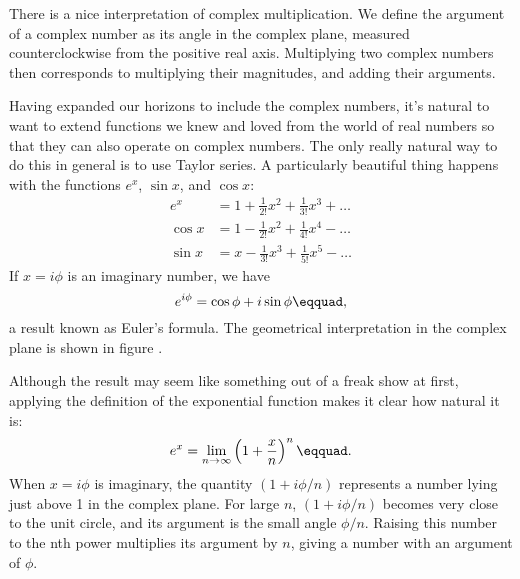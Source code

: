 
There is a nice interpretation of complex multiplication.
We define the argument of a complex number as its angle in the complex plane, measured
counterclockwise from the positive real axis.
Multiplying two complex numbers then corresponds to multiplying their magnitudes,
and adding their arguments.


Having expanded our horizons to include the complex numbers, it's natural to want to extend
functions we knew and loved from the world of real numbers so that they can also operate on
complex numbers. The only really natural way to do this in general is to use Taylor series.
A particularly beautiful thing happens with the functions $e^x$, $\sin x$, and $\cos x$:
\begin{align*}
  e^x    &= 1 + \frac{1}{2!}x^2 + \frac{1}{3!}x^3 + \ldots \\
  \cos x &= 1 - \frac{1}{2!}x^2 + \frac{1}{4!}x^4 - \ldots \\
  \sin x &= x - \frac{1}{3!}x^3 + \frac{1}{5!}x^5 - \ldots 
\end{align*}
If $x=i\phi$ is an imaginary number, we have
\begin{equation*}
  e^{i\phi} = \cos \phi + i \sin \phi\eqquad,
\end{equation*}
a result known as Euler's formula.
The geometrical interpretation in the complex
plane is shown in figure .


Although the result may seem like something out of a freak show at first,
applying the definition of the exponential function
makes it clear how natural it is:
\begin{align*}
  e^x = \lim_{n\rightarrow \infty} \left(1+\frac{x}{n}\right)^n\eqquad.
\end{align*}
When $x=i\phi$ is imaginary, the quantity $(1+i\phi/n)$ represents a number
lying just above 1 in the complex plane. For large $n$, $(1+i\phi/n)$
becomes very close to the unit circle, and its argument is the small
angle $\phi/n$. Raising this number to the nth power multiplies its
argument by $n$, giving a number with an argument of $\phi$.


